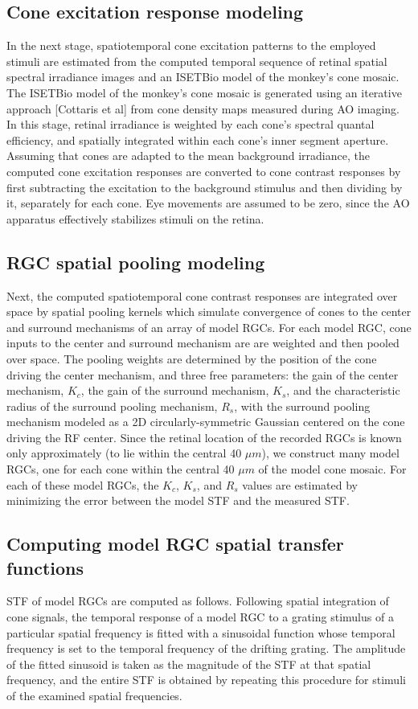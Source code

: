 \documentclass[11pt, oneside]{article}   	%
\begin{document}
\subsection{Cone excitation response modeling}
In the next stage, spatiotemporal cone excitation patterns to the employed stimuli are estimated from the computed temporal sequence of retinal spatial spectral irradiance images and an ISETBio model of the monkey's cone mosaic. The ISETBio model of the monkey's cone mosaic is generated using an iterative approach [Cottaris et al] from cone density maps measured during AO imaging. In this stage, retinal irradiance is weighted by each cone's spectral quantal efficiency, and spatially integrated within each cone's inner segment aperture. Assuming that cones are adapted to the mean background irradiance, the computed cone excitation responses are converted to cone contrast responses by first subtracting the excitation to the background stimulus and then dividing by it, separately for each cone. Eye movements are assumed to be zero, since the AO apparatus effectively stabilizes stimuli on the retina.

\subsection{RGC spatial pooling modeling}
Next, the computed spatiotemporal cone contrast responses are integrated over space by spatial pooling kernels which simulate convergence of cones to the center and surround mechanisms of an array of model RGCs. For each model RGC, cone inputs to the center and surround mechanism are are weighted and then pooled over space. The pooling weights are determined by the position of the cone driving the center mechanism, and three free parameters: the gain of the center mechanism, $K_c$, the gain of the surround mechanism, $K_s$, and the characteristic radius of the surround pooling mechanism, $R_s$, with the surround pooling mechanism modeled as a 2D circularly-symmetric Gaussian centered on the cone driving the RF center. Since the retinal location of the recorded RGCs is known only approximately (to lie within the central 40 $\mu m$), we construct many model RGCs, one for each cone within the central 40 $\mu m$ of the model cone mosaic. For each of these model RGCs, the $K_c$, $K_s$, and $R_s$ values are estimated by minimizing the error between the model STF and the measured STF. 

\subsection{Computing model RGC spatial transfer functions}
STF of model RGCs are computed as follows. Following spatial integration of cone signals, the temporal response of a model RGC to a grating stimulus of a particular spatial frequency is fitted with a sinusoidal function whose temporal frequency is set to the temporal frequency of the drifting grating. The amplitude of the fitted sinusoid is taken as the magnitude of the STF at that spatial frequency, and the entire STF is obtained by repeating this procedure for stimuli of the examined spatial frequencies. 
\end{document}
